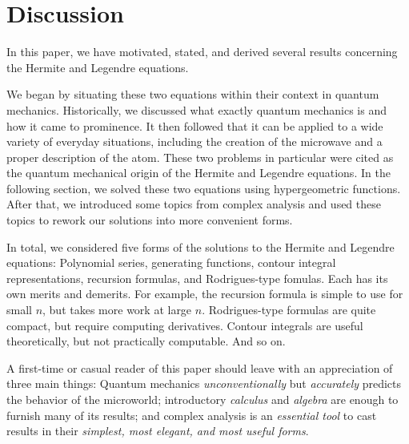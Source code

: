 \documentclass[titlepage]{article}
\numberwithin{equation}{section}
\begin{document}
\section{Discussion}
In this paper, we have motivated, stated, and derived several results concerning the Hermite and Legendre equations.\par
We began by situating these two equations within their context in quantum mechanics. Historically, we discussed what exactly quantum mechanics is and how it came to prominence. It then followed that it can be applied to a wide variety of everyday situations, including the creation of the microwave and a proper description of the atom. These two problems in particular were cited as the quantum mechanical origin of the Hermite and Legendre equations. In the following section, we solved these two equations using hypergeometric functions. After that, we introduced some topics from complex analysis and used these topics to rework our solutions into more convenient forms.\par
In total, we considered five forms of the solutions to the Hermite and Legendre equations: Polynomial series, generating functions, contour integral representations, recursion formulas, and Rodrigues-type fomulas. Each has its own merits and demerits. For example, the recursion formula is simple to use for small $n$, but takes more work at large $n$. Rodrigues-type formulas are quite compact, but require computing derivatives. Contour integrals are useful theoretically, but not practically computable. And so on.\par
A first-time or casual reader of this paper should leave with an appreciation of three main things: Quantum mechanics \emph{unconventionally} but \emph{accurately} predicts the behavior of the microworld; introductory \emph{calculus} and \emph{algebra} are enough to furnish many of its results; and complex analysis is an \emph{essential tool} to cast results in their \emph{simplest, most elegant, and most useful forms}.

\newpage



\renewcommand{\leftmark}{References}
\printbibliography[heading=bibintoc]
\end{document}

